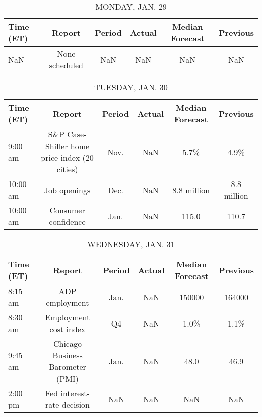 \documentclass{article}%
\begin{document}
%
\normalsize%


\begin{table}[htbp]%
\caption{MONDAY, JAN. 29}%
\centering%
\begin{adjustbox}{width=1\textwidth}%
\begin{tabular}{lccccc}
\toprule
Time (ET) &         Report & Period & Actual & Median Forecast & Previous \\
\midrule
      NaN & None scheduled &    NaN &    NaN &             NaN &      NaN \\
\bottomrule
\end{tabular}
%
\end{adjustbox}%
\end{table}

%


\begin{table}[htbp]%
\caption{TUESDAY, JAN. 30}%
\centering%
\begin{adjustbox}{width=1\textwidth}%
\begin{tabular}{lccccc}
\toprule
Time (ET) &                                        Report & Period & Actual & Median Forecast &    Previous \\
\midrule
  9:00 am & S\&P Case-Shiller home price index (20 cities) &   Nov. &    NaN &            5.7\% &        4.9\% \\
 10:00 am &                                  Job openings &   Dec. &    NaN &     8.8 million & 8.8 million \\
 10:00 am &                           Consumer confidence &   Jan. &    NaN &           115.0 &       110.7 \\
\bottomrule
\end{tabular}
%
\end{adjustbox}%
\end{table}

%


\begin{table}[htbp]%
\caption{WEDNESDAY, JAN. 31}%
\centering%
\begin{adjustbox}{width=1\textwidth}%
\begin{tabular}{lccccc}
\toprule
Time (ET) &                           Report & Period & Actual & Median Forecast & Previous \\
\midrule
  8:15 am &                   ADP employment &   Jan. &    NaN &          150000 &   164000 \\
  8:30 am &            Employment cost index &     Q4 &    NaN &            1.0\% &     1.1\% \\
  9:45 am & Chicago Business Barometer (PMI) &   Jan. &    NaN &            48.0 &     46.9 \\
  2:00 pm &       Fed interest-rate decision &    NaN &    NaN &             NaN &      NaN \\
\bottomrule
\end{tabular}
%
\end{adjustbox}%
\end{table}
\end{document}
